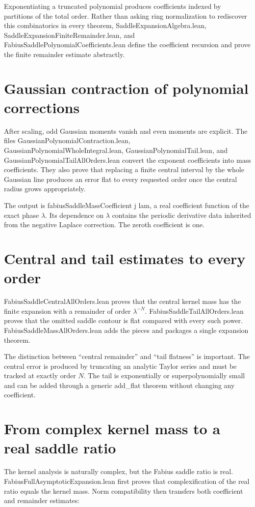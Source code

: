 \documentclass[11pt,a4paper,openany]{book}
\def\module#1{#1.lean}
\def\decl#1{#1}
\newcommand{\module}[1]{\nolinkurl{#1.lean}}
\newcommand{\decl}[1]{\texttt{\detokenize{#1}}}
\begin{document}
Exponentiating a truncated polynomial produces coefficients indexed by
partitions of the total order.  Rather than asking ring normalization to
rediscover this combinatorics in every theorem, \module{SaddleExpansionAlgebra},
\module{SaddleExpansionFiniteRemainder}, and
\module{FabiusSaddlePolynomialCoefficients} define the coefficient recursion
and prove the finite remainder estimate abstractly.

\section{Gaussian contraction of polynomial corrections}
After scaling, odd Gaussian moments vanish and even moments are explicit.  The
files \module{GaussianPolynomialContraction},
\module{GaussianPolynomialWholeIntegral},
\module{GaussianPolynomialTail}, and
\module{GaussianPolynomialTailAllOrders} convert the exponent coefficients
into mass coefficients.  They also prove that replacing a finite central
interval by the whole Gaussian line produces an error flat to every requested
order once the central radius grows appropriately.

The output is \decl{fabiusSaddleMassCoefficient j lam}, a real coefficient
function of the exact phase $\lambda$.  Its dependence on $\lambda$ contains
the periodic derivative data inherited from the negative Laplace correction.
The zeroth coefficient is one.

\section{Central and tail estimates to every order}
\module{FabiusSaddleCentralAllOrders} proves that the central kernel mass has
the finite expansion with a remainder of order $\lambda^{-N}$.
\module{FabiusSaddleTailAllOrders} proves that the omitted saddle contour is
flat compared with every such power.  \module{FabiusSaddleMassAllOrders} adds
the pieces and packages a single expansion theorem.

The distinction between “central remainder” and “tail flatness” is important.
The central error is produced by truncating an analytic Taylor series and must
be tracked at exactly order $N$.  The tail is exponentially or superpolynomially
small and can be added through a generic \decl{add_flat} theorem without
changing any coefficient.

\section{From complex kernel mass to a real saddle ratio}
The kernel analysis is naturally complex, but the Fabius saddle ratio is real.
\module{FabiusFullAsymptoticExpansion} first proves that complexification of the
real ratio equals the kernel mass.  Norm compatibility then transfers both
coefficient and remainder estimates:
\end{document}
